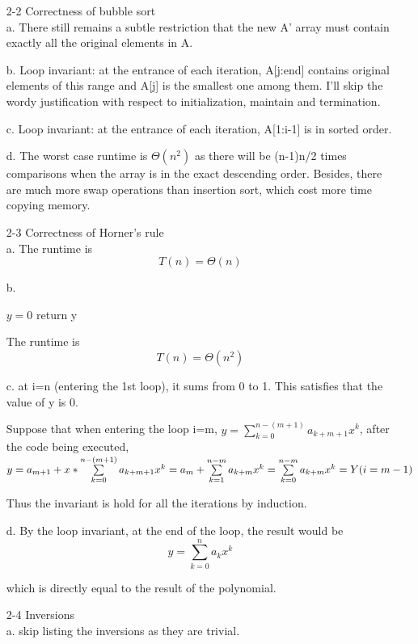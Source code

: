 \documentclass[]{article}
\begin{document}
\begin{enumerate}
\item[2-2] Correctness of bubble sort\\

a. There still remains a subtle restriction that the new A' array must contain exactly all the original elements in A.

b. Loop invariant: at the entrance of each iteration, A[j:end] contains original elements of this range and A[j] is the smallest one among them. I'll skip the wordy justification with respect to initialization, maintain and termination.

c. Loop invariant: at the entrance of each iteration, A[1:i-1] is in sorted order. 

d. The worst case runtime is $ \Theta(n^2) $ as there will be (n-1)n/2 times comparisons when the array is in the exact descending order. Besides, there are much more swap operations than insertion sort, which cost more time copying memory.

\item[2-3] Correctness of Horner's rule\\
a. The runtime is $$ T(n)=\Theta(n) $$

b. \begin{algorithm}
	$y=0$
	return y
\end{algorithm}

The runtime is $$T(n)=\Theta(n^2)$$

c. at i=n (entering the 1st loop), it sums from 0 to 1. This satisfies that the value of y is 0.

Suppose that when entering the loop i=m, $ y=\sum\limits_{k=0}^{n-(m+1)} a_{k+m+1}x^k $, after the code being executed, $ y=a_{m+1} + x*\sum\limits_{k=0}^{n-(m+1)} a_{k+m+1}x^k \\
= a_{m} + \sum\limits_{k=1}^{n-m} a_{k+m}x^k
= \sum\limits_{k=0}^{n-m} a_{k+m}x^k = Y(i=m-1) $

Thus the invariant is hold for all the iterations by induction.

d. By the loop invariant, at the end of the loop, the result would be $$ y=\sum\limits_{k=0}^{n} a_{k}x^k $$

which is directly equal to the result of the polynomial.

\item[2-4] Inversions\\
a. skip listing the inversions as they are trivial.


\end{enumerate}
\end{document}

